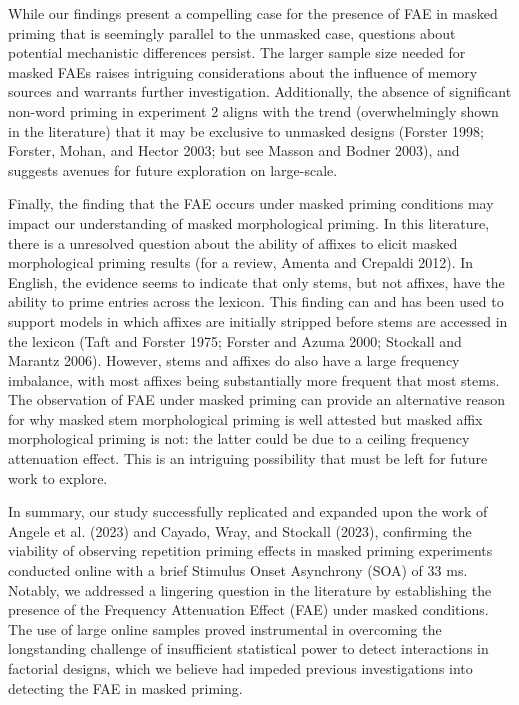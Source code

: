 \documentclass[
]{interact}
\begin{document}
While our findings present a compelling case for the presence of FAE in
masked priming that is seemingly parallel to the unmasked case,
questions about potential mechanistic differences persist. The larger
sample size needed for masked FAEs raises intriguing considerations
about the influence of memory sources and warrants further
investigation. Additionally, the absence of significant non-word priming
in experiment 2 aligns with the trend (overwhelmingly shown in the
literature) that it may be exclusive to unmasked designs (Forster 1998;
Forster, Mohan, and Hector 2003; but see Masson and Bodner 2003), and
suggests avenues for future exploration on large-scale.

Finally, the finding that the FAE occurs under masked priming conditions
may impact our understanding of masked morphological priming. In this
literature, there is a unresolved question about the ability of affixes
to elicit masked morphological priming results (for a review, Amenta and
Crepaldi 2012). In English, the evidence seems to indicate that only
stems, but not affixes, have the ability to prime entries across the
lexicon. This finding can and has been used to support models in which
affixes are initially stripped before stems are accessed in the lexicon
(Taft and Forster 1975; Forster and Azuma 2000; Stockall and Marantz
2006). However, stems and affixes do also have a large frequency
imbalance, with most affixes being substantially more frequent that most
stems. The observation of FAE under masked priming can provide an
alternative reason for why masked stem morphological priming is well
attested but masked affix morphological priming is not: the latter could
be due to a ceiling frequency attenuation effect. This is an intriguing
possibility that must be left for future work to explore.

In summary, our study successfully replicated and expanded upon the work
of Angele et al. (2023) and Cayado, Wray, and Stockall (2023),
confirming the viability of observing repetition priming effects in
masked priming experiments conducted online with a brief Stimulus Onset
Asynchrony (SOA) of 33 ms. Notably, we addressed a lingering question in
the literature by establishing the presence of the Frequency Attenuation
Effect (FAE) under masked conditions. The use of large online samples
proved instrumental in overcoming the longstanding challenge of
insufficient statistical power to detect interactions in factorial
designs, which we believe had impeded previous investigations into
detecting the FAE in masked priming.
\end{document}
